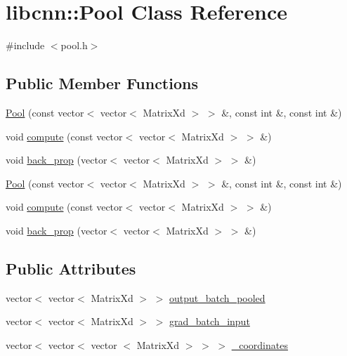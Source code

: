 \hypertarget{classlibcnn_1_1_pool}{\section{libcnn\-:\-:\-Pool \-Class \-Reference}
\label{classlibcnn_1_1_pool}
}


{\ttfamily \#include $<$pool.\-h$>$}

\subsection*{\-Public \-Member \-Functions}
\begin{DoxyCompactItemize}
\item 
\hyperlink{classlibcnn_1_1_pool_a25dda142002e7d9447df8b529a03e8c6}{\-Pool} (const vector$<$ vector$<$ \-Matrix\-Xd $>$ $>$ \&, const int \&, const int \&)
\item 
void \hyperlink{classlibcnn_1_1_pool_a7e1edbfb399a7530fb936f0378fbe1a1}{compute} (const vector$<$ vector$<$ \-Matrix\-Xd $>$ $>$ \&)
\item 
void \hyperlink{classlibcnn_1_1_pool_a7971925b58312b01b92402f6991460cd}{back\-\_\-prop} (vector$<$ vector$<$ \-Matrix\-Xd $>$ $>$ \&)
\item 
\hyperlink{classlibcnn_1_1_pool_a25dda142002e7d9447df8b529a03e8c6}{\-Pool} (const vector$<$ vector$<$ \-Matrix\-Xd $>$ $>$ \&, const int \&, const int \&)
\item 
void \hyperlink{classlibcnn_1_1_pool_a7e1edbfb399a7530fb936f0378fbe1a1}{compute} (const vector$<$ vector$<$ \-Matrix\-Xd $>$ $>$ \&)
\item 
void \hyperlink{classlibcnn_1_1_pool_a7971925b58312b01b92402f6991460cd}{back\-\_\-prop} (vector$<$ vector$<$ \-Matrix\-Xd $>$ $>$ \&)
\end{DoxyCompactItemize}
\subsection*{\-Public \-Attributes}
\begin{DoxyCompactItemize}
\item 
vector$<$ vector$<$ \-Matrix\-Xd $>$ $>$ \hyperlink{classlibcnn_1_1_pool_a64cbcc583ad1bb2bac935aa3012b6370}{output\-\_\-batch\-\_\-pooled}
\item 
vector$<$ vector$<$ \-Matrix\-Xd $>$ $>$ \hyperlink{classlibcnn_1_1_pool_a8e645f991ecf5142723cdf468ff8e70d}{grad\-\_\-batch\-\_\-input}
\item 
vector$<$ vector$<$ vector\*
$<$ \-Matrix\-Xd $>$ $>$ $>$ \hyperlink{classlibcnn_1_1_pool_a642547ee5b87d5aa1d0efa66323b8634}{\-\_\-coordinates}
\end{DoxyCompactItemize}


